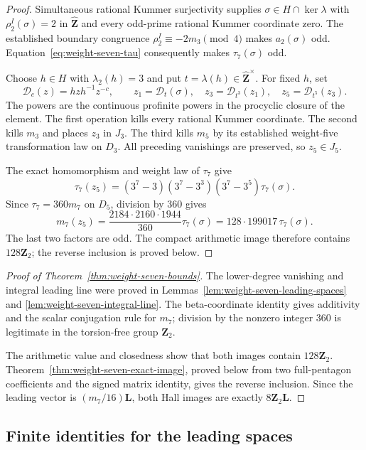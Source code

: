 \begin{proof}
Simultaneous rational Kummer surjectivity supplies
$\sigma\in H\cap\ker\lambda$ with $\rho_2^I(\sigma)=2$ in
$\widehat{\mathbf Z}$ and every odd-prime rational Kummer coordinate
zero. The established boundary congruence
$\rho_2^I\equiv-2m_3\pmod4$ makes $a_2(\sigma)$ odd.
Equation~\eqref{eq:weight-seven-tau} consequently makes
$\tau_7(\sigma)$ odd.

Choose $h\in H$ with $\lambda_2(h)=3$ and put
$t=\lambda(h)\in\widehat{\mathbf Z}^{\times}$. For fixed $h$, set
\[
 \mathcal D_c(z)=hzh^{-1}z^{-c},\qquad
 z_1=\mathcal D_t(\sigma),\quad
 z_3=\mathcal D_{t^3}(z_1),\quad
 z_5=\mathcal D_{t^5}(z_3).
\]
The powers are the continuous profinite powers in the procyclic
closure of the element. The first operation kills every rational
Kummer coordinate. The second kills $m_3$ and places $z_3$ in $J_3$.
The third kills $m_5$ by its established weight-five transformation
law on $D_3$. All preceding vanishings are preserved, so $z_5\in J_5$.

The exact homomorphism and weight law of $\tau_7$ give
\[
 \tau_7(z_5)=(3^7-3)(3^7-3^3)(3^7-3^5)\tau_7(\sigma).
\]
Since $\tau_7=360m_7$ on $D_5$, division by $360$ gives
\[
 m_7(z_5)=\frac{2184\cdot2160\cdot1944}{360}\tau_7(\sigma)
         =128\cdot199017\,\tau_7(\sigma).
\]
The last two factors are odd. The compact arithmetic image
therefore contains $128\mathbf Z_2$; the reverse inclusion is
proved below.
\end{proof}

\begin{proof}[Proof of Theorem~\ref{thm:weight-seven-bounds}]
The lower-degree vanishing and integral leading line were proved in
Lemmas~\ref{lem:weight-seven-leading-spaces} and
\ref{lem:weight-seven-integral-line}. The beta-coordinate identity
gives additivity and the scalar conjugation rule for $m_7$; division
by the nonzero integer $360$ is legitimate in the torsion-free group
$\mathbf Z_2$.

The arithmetic value and closedness show that both images contain
$128\mathbf Z_2$. Theorem~\ref{thm:weight-seven-exact-image}, proved
below from two full-pentagon coefficients and the signed matrix
identity, gives the reverse inclusion. Since the leading vector is
$(m_7/16)\mathbf L$, both Hall images are exactly
$8\mathbf Z_2\mathbf L$.
\end{proof}

\subsection{Finite identities for the leading spaces}
\label{subsec:weight-seven-leading-certificate}

